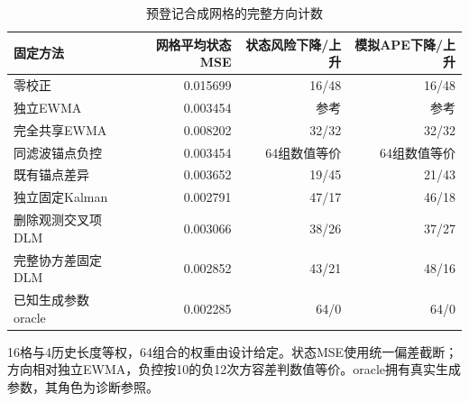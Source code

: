\begin{table}[!htbp]\centering
\caption{预登记合成网格的完整方向计数}\label{tab:syntheticcount}
\small\setlength{\tabcolsep}{4pt}\renewcommand{\arraystretch}{1.15}
\begin{tabularx}{\linewidth}{L r r r}\toprule
固定方法 & 网格平均状态MSE & 状态风险下降/上升 & 模拟APE下降/上升 \\
\midrule
零校正 & 0.015699 & 16/48 & 16/48 \\
独立EWMA & 0.003454 & 参考 & 参考 \\
完全共享EWMA & 0.008202 & 32/32 & 32/32 \\
同滤波锚点负控 & 0.003454 & 64组数值等价 & 64组数值等价 \\
既有锚点差异 & 0.003652 & 19/45 & 21/43 \\
独立固定Kalman & 0.002791 & 47/17 & 46/18 \\
删除观测交叉项DLM & 0.003066 & 38/26 & 37/27 \\
完整协方差固定DLM & 0.002852 & 43/21 & 48/16 \\
已知生成参数oracle & 0.002285 & 64/0 & 64/0 \\
\bottomrule\end{tabularx}
\par\vspace{4pt}\begin{minipage}{\linewidth}\footnotesize 16格与4历史长度等权，64组合的权重由设计给定。状态MSE使用统一偏差截断；方向相对独立EWMA，负控按10的负12次方容差判数值等价。oracle拥有真实生成参数，其角色为诊断参照。\end{minipage}
\end{table}
